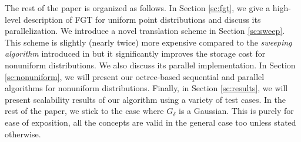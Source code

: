 The rest of the paper is organized as follows. In Section \ref{sc:fgt}, we give a high-level description of FGT for uniform point 
distributions and discuss its parallelization. We introduce a novel translation scheme in Section \ref{sc:sweep}. This scheme is 
slightly (nearly twice) more expensive compared to the {\em sweeping algorithm} introduced in \cite{greengard98} but it 
significantly improves the storage cost for nonuniform distributions. We also discuss its parallel implementation. In Section 
\ref{sc:nonuniform}, we will present our octree-based sequential and parallel algorithms for nonuniform distributions. Finally, in 
Section \ref{sc:results}, we will present scalability results of our algorithm using a variety of test cases. 
In the rest of the paper, we stick to the case where $G_\delta$ is a Gaussian. This is purely for ease of exposition, all the concepts 
are valid in the general case too unless stated otherwise. 
